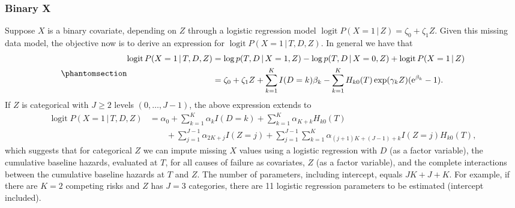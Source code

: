 \documentclass[
  letterpaper,
  paper=240mm:170mm,
  twoside=true,
  open=right,
  fontsize=10pt,
  pagesize=false,
  BCOR=15mm,
  DIV=14,
  headinclude=true,
  footinclude=false,
  headsepline=on]{scrbook}
\DeclareMathOperator{\logit}{logit}
\newcommand{\given}{\,|\,}
\begin{document}
\subsubsection*{Binary X}\label{binary-x-1}

Suppose \(X\) is a binary covariate, depending on \(Z\) through a
logistic regression model
\(\logit P(X = 1 \given Z) = \zeta_0 + \zeta_1 Z\). Given this missing
data model, the objective now is to derive an expression for
\(\logit P(X = 1 \given T, D, Z)\). In general we have that
\begin{equation}\phantomsection\label{eq-imp-bin}{
\begin{aligned}
    \logit P(X = 1 \given T, D, Z) &= \log p(T, D \given X = 1, Z) - \log p(T, D \given X = 0, Z) + \logit P(X = 1 \given Z)  \\
    &= \zeta_0 + \zeta_1 Z + \sum^K_{k = 1} I(D=k) \beta_k - \sum^K_{k = 1} H_{k0}(T)\exp(\gamma_k Z)(\mathrm{e}^{\beta_k}  - 1). 
\end{aligned}
}\end{equation} If \(Z\) is categorical with \(J \geq 2\) levels
\((0, \ldots, J-1)\), the above expression extends to \begin{align*}
    \logit P(X = 1 \given T, D, Z) &= \alpha_0 + \sum^K_{k = 1}\alpha_k I(D=k) + \sum^K_{k = 1} \alpha_{K+k} H_{k0}(T) \nonumber \\
    &\qquad + \sum^{J-1}_{j=1}\alpha_{2K + j}I(Z = j) + \sum^{J-1}_{j=1} \sum^K_{k = 1} \alpha_{(j+1)K + (J-1) + k}I(Z = j) H_{k0}(T),
\end{align*} which suggests that for categorical \(Z\) we can impute
missing \(X\) values using a logistic regression with \(D\) (as a factor
variable), the cumulative baseline hazards, evaluated at \(T\), for all
causes of failure as covariates, \(Z\) (as a factor variable), and the
complete interactions between the cumulative baseline hazards at \(T\)
and \(Z\). The number of parameters, including intercept, equals
\(JK + J + K\). For example, if there are \(K = 2\) competing risks and
\(Z\) has \(J = 3\) categories, there are 11 logistic regression
parameters to be estimated (intercept included).
\end{document}
